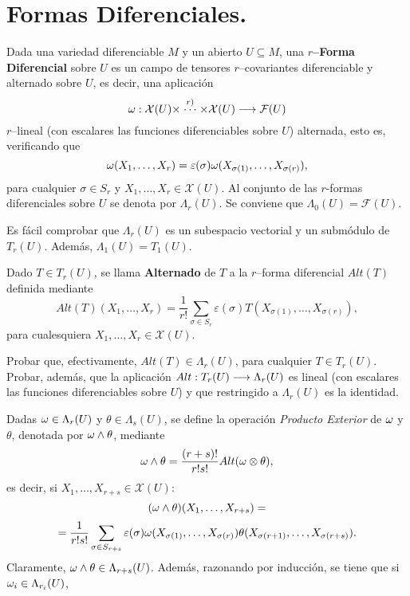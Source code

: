 \documentclass[cursovd_portada.tex]{subfiles}
\begin{document}
\section{Formas Diferenciales.}
\begin{defi}
Dada una variedad diferenciable $M$ y un abierto $U\subseteq M$, una {\bf $r$--Forma Diferencial} sobre $U$ es un
campo de tensores $r$--covariantes diferenciable y alternado sobre $U$, es decir, una aplicaci\'{o}n
$$\omega:{\cal X}(U)\times\stackrel{r)}\cdots\times\mathcal{X}(U)\longrightarrow\mathcal{F}(U)$$
$r$--lineal (con escalares las funciones diferenciables sobre $U$) alternada, esto es, verificando que
$$\omega(X_1,\dots ,X_r)=\varepsilon(\sigma)\omega(X_{\sigma(1)},\dots ,X_{\sigma(r)}),$$
para cualquier $\sigma\in S_r$ y $X_1,\dots ,X_r\in\mathcal{X}(U)$. Al conjunto de las $r$-formas diferenciales
sobre $U$ se denota por $\Lambda_r(U)$. Se conviene que $\Lambda_0(U)=\mathcal{F}(U)$.
\end{defi}
\begin{nota}
{\rm Es f\'{a}cil comprobar que $\Lambda_r(U)$ es un subespacio vectorial y un sub\-m\'{o}\-du\-lo de $T_r(U)$. Adem\'{a}s,
$\Lambda_1(U)=T_1(U)$. }
\end{nota}
\begin{defi}
Dado $T\in T_r(U)$, se llama {\bf Alternado} de $T$ a la $r$--forma diferencial $Alt(T)$ definida mediante
$$Alt(T)(X_1,\dots ,X_r)=\frac{1}{r!}\sum_{\sigma\in S_r}\varepsilon(\sigma)T(X_{\sigma(1)},\dots
,X_{\sigma(r)}),$$ para cualesquiera $X_1,\dots ,X_r\in\mathcal{X}(U)$.
\end{defi}
\begin{ejer}
{\rm Probar que, efectivamente, $Alt(T)\in\Lambda_r(U)$, para cualquier $T\in T_r(U)$. Probar, adem\'{a}s, que
la aplicaci\'{o}n $Alt:T_r(U)\longrightarrow\Lambda_r(U)$ es lineal (con escalares las funciones diferenciables sobre $U$) y que
restringido a $\Lambda_r(U)$ es la identidad.}
\end{ejer}
Dadas $\omega\in\Lambda_r(U)$ y $\theta\in\Lambda_s(U)$, se define la operaci\'{o}n {\it Producto Exterior} de $\omega$ y
$\theta$, denotada por $\omega\wedge\theta$, mediante
$$\omega\wedge\theta=\frac{(r+s)!}{r!s!}Alt(\omega\otimes\theta),$$
es decir, si $X_1,\dots ,X_{r+s}\in\mathcal{X}(U)$:
$$(\omega\wedge\theta)(X_1,\dots ,X_{r+s})=$$
$$=\frac{1}{r!s!}\sum_{\sigma\in S_{r+s}}\varepsilon(\sigma)\omega(X_{\sigma(1)},\dots
,X_{\sigma(r)})\theta(X_{\sigma(r+1)},\dots ,X_{\sigma(r+s)}).$$ \hs Claramente,
$\omega\wedge\theta\in\Lambda_{r+s}(U)$. Adem\'{a}s, razonando por inducci\'{o}n, se tiene que si $\omega_i\in\Lambda_{r_i}(U)$,
\end{document}
